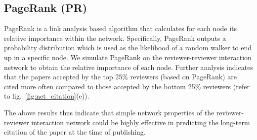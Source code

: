 \subsection{PageRank (PR)}

PageRank is a link analysis based algorithm that calculates for each node its relative importance within 
the network. Specifically, PageRank outputs a probability distribution which is used as the likelihood of a random walker to end up in a specific node. We simulate PageRank on the reviewer-reviewer interaction 
network to obtain the relative importance of each node. Further analysis indicates that the papers accepted by the top 25\% reviewers (based on PageRank) are cited more often compared to those accepted by the bottom 25\% reviewers (refer to fig.~\ref{fig:net_citation}(e)). 

The above results thus indicate that simple network properties of the reviewer-reviewer interaction network could be highly effective in predicting the long-term citation of the paper at the time of publishing. 
\medskip